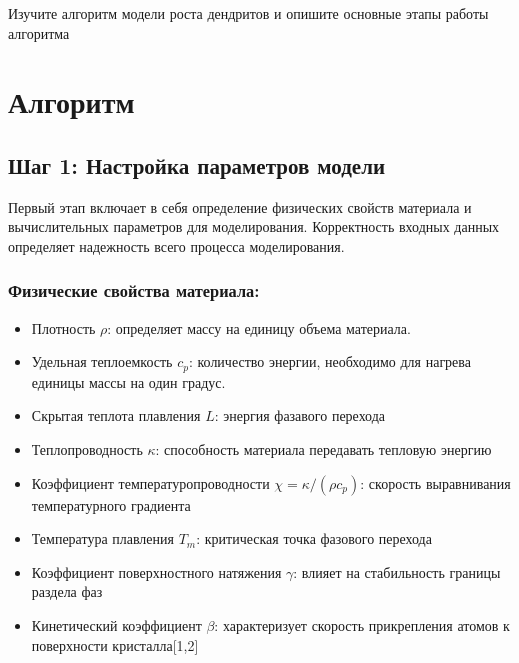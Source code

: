 \documentclass[
  12pt,
  a4paper,
  DIV=11,
  numbers=noendperiod]{scrreprt}
\providecommand{\tightlist}{%
  \setlength{\itemsep}{0pt}\setlength{\parskip}{0pt}}\usepackage{longtable,booktabs,array}
\begin{document}
Изучите алгоритм модели роста дендритов и опишите основные этапы работы
алгоритма

\chapter{Алгоритм}\label{ux430ux43bux433ux43eux440ux438ux442ux43c}

\section{Шаг 1: Настройка параметров
модели}\label{ux448ux430ux433-1-ux43dux430ux441ux442ux440ux43eux439ux43aux430-ux43fux430ux440ux430ux43cux435ux442ux440ux43eux432-ux43cux43eux434ux435ux43bux438}

Первый этап включает в себя определение физических свойств материала и
вычислительных параметров для моделирования. Корректность входных данных
определяет надежность всего процесса моделирования.

\subsection{Физические свойства
материала:}\label{ux444ux438ux437ux438ux447ux435ux441ux43aux438ux435-ux441ux432ux43eux439ux441ux442ux432ux430-ux43cux430ux442ux435ux440ux438ux430ux43bux430}

\begin{itemize}
\tightlist
\item
  Плотность \(\rho\): определяет массу на единицу объема материала.
\item
  Удельная теплоемкость \(c_p\): количество энергии, необходимо для
  нагрева единицы массы на один градус.
\item
  Скрытая теплота плавления \(L\): энергия фазавого перехода
\item
  Теплопроводность \(\kappa\): способность материала передавать тепловую
  энергию
\item
  Коэффициент температуропроводности \(\chi = \kappa/(\rho c_p)\):
  скорость выравнивания температурного градиента
\item
  Температура плавления \(T_m\): критическая точка фазового перехода
\item
  Коэффициент поверхностного натяжения \(\gamma\): влияет на
  стабильность границы раздела фаз
\item
  Кинетический коэффициент \(\beta\): характеризует скорость
  прикрепления атомов к поверхности кристалла{[}1,2{]}
\end{itemize}
\end{document}
